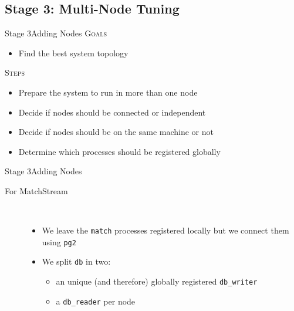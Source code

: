 \documentclass[utf8,hyperref={colorlinks=true}]{beamer}
\begin{document}
\subsection{Stage 3: Multi-Node Tuning}
\begin{frame}{Stage 3}{Adding Nodes}
	\textsc{Goals}
	\begin{itemize}
		\item Find the best system topology
	\end{itemize}
	\pause
	\textsc{Steps}
	\begin{itemize}
		\item Prepare the system to run in more than one node
		\item Decide if nodes should be connected or independent
		\item Decide if nodes should be on the same machine or not
		\item Determine which processes should be registered globally
	\end{itemize}
\end{frame}
\begin{frame}{Stage 3}{Adding Nodes}
	\begin{description}
		\item[For MatchStream]~\\
			\begin{itemize}
				\item We leave the \texttt{match} processes registered locally but we connect them using \texttt{pg2}
				\item We split \texttt{db} in two:
					\begin{itemize}
						\item an unique (and therefore) globally registered \texttt{db\_writer}
						\item a \texttt{db\_reader} per node
					\end{itemize}
			\end{itemize}
	\end{description}
\end{frame}
\end{document}
